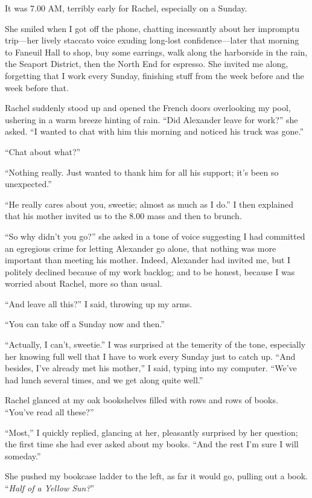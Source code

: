 It was 7.00 AM, terribly early for Rachel, especially on a Sunday.

She smiled when I got off the phone, chatting incessantly about her
impromptu trip---her lively staccato voice exuding long-lost
con\-fi\-dence---later that morning to Faneuil Hall to shop, buy some
earrings, walk along the harborside in the rain, the Seaport District,
then the North End for espresso. She invited me along, forgetting that I
work every Sunday, finishing stuff from the week before and the week
before that.

Rachel suddenly stood up and opened the French doors overlooking my
pool, ushering in a warm breeze hinting of rain. ``Did Alexander leave
for work?'' she asked. ``I wanted to chat with him this morning and
noticed his truck was gone.''

``Chat about what?''

``Nothing really. Just wanted to thank him for all his support; it's
been so unexpected.''

``He really cares about you, sweetie; almost as much as I do.'' I then
explained that his mother invited us to the 8.00 mass and then to
brunch.

``So why didn't you go?'' she asked in a tone of voice suggesting I had
committed an egregious crime for letting Alexander go alone, that
nothing was more important than meeting his mother. Indeed, Alexander
had invited me, but I politely declined because of my work backlog; and
to be honest, because I was worried about Rachel, more so than usual.

``And leave all this?'' I said, throwing up my arms.

``You can take off a Sunday now and then.''

``Actually, I can't, sweetie.'' I was surprised at the temerity of the
tone, especially her knowing full well that I have to work every Sunday
just to catch up. ``And besides, I've already met his mother,'' I said,
typing into my computer. ``We've had lunch several times, and we get
along quite well.''

Rachel glanced at my oak bookshelves filled with rows and rows of books.
``You've read all these?''

``Most,'' I quickly replied, glancing at her, pleasantly surprised by
her question; the first time she had ever asked about my books. ``And
the rest I'm sure I will someday.''

She pushed my bookcase ladder to the left, as far it would go, pulling
out a book. ``\emph{Half of a Yellow Sun?}''

